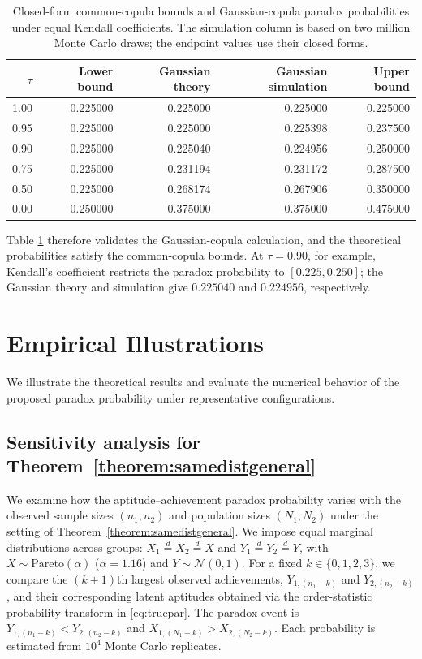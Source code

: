 \documentclass[12pt]{article}
\begin{document}
\begin{table}[H]
\centering
\small
\setlength{\tabcolsep}{5pt}
\begin{tabular}{rrrrr}
\hline
\(\tau\) & Lower bound & Gaussian theory & Gaussian simulation & Upper bound \\
\hline
1.00 & 0.225000 & 0.225000 & 0.225000 & 0.225000 \\
0.95 & 0.225000 & 0.225000 & 0.225398 & 0.237500 \\
0.90 & 0.225000 & 0.225040 & 0.224956 & 0.250000 \\
0.75 & 0.225000 & 0.231194 & 0.231172 & 0.287500 \\
0.50 & 0.225000 & 0.268174 & 0.267906 & 0.350000 \\
0.00 & 0.250000 & 0.375000 & 0.375000 & 0.475000 \\
\hline
\end{tabular}
\caption{Closed-form common-copula bounds and Gaussian-copula paradox
probabilities under equal Kendall coefficients. The simulation column is based
on two million Monte Carlo draws; the endpoint values use their closed forms.}
\label{tab:gaussian-copula-validation}
\end{table}

Table \ref{tab:gaussian-copula-validation} therefore validates the Gaussian-copula calculation, and the theoretical probabilities satisfy the common-copula
bounds. At $\tau=0.90$, for example, Kendall's coefficient restricts the paradox probability to $[0.225,0.250]$; the Gaussian theory and simulation give $0.225040$ and $0.224956$, respectively.

\section{Empirical Illustrations}

We illustrate the theoretical results and evaluate the numerical behavior of the proposed paradox probability under representative configurations.

\subsection{Sensitivity analysis for Theorem~\ref{theorem:samedistgeneral}}

We examine how the aptitude--achievement paradox probability varies with the observed sample sizes $(n_1,n_2)$ and population sizes $(N_1,N_2)$ under the setting of Theorem~\ref{theorem:samedistgeneral}. We impose equal marginal distributions across groups: $X_1\overset{d}{=}X_2\overset{d}{=}X$ and $Y_1\overset{d}{=}Y_2\overset{d}{=}Y$, with $X\sim\mathrm{Pareto}(\alpha)$ ($\alpha=1.16$) and $Y\sim\mathcal N(0,1)$. For a fixed $k\in\{0,1,2,3\}$, we compare the $(k+1)$th largest observed achievements, $Y_{1,(n_1-k)}$ and $Y_{2,(n_2-k)}$, and their corresponding latent aptitudes obtained via the order-statistic probability transform in \eqref{eq:truepar}. The paradox event is $Y_{1,(n_1-k)}<Y_{2,(n_2-k)}$ and $X_{1,(N_1-k)} > X_{2,(N_2-k)}$. Each probability is estimated from $10^4$ Monte Carlo replicates.
\end{document}
